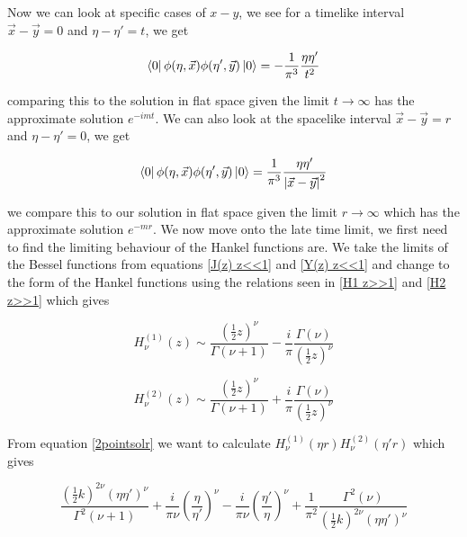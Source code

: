 \documentclass[a4paper,11pt]{article}
\numberwithin{equation}{section}
\numberwithin{figure}{section}
\begin{document}
\begin{large}
Now we can look at specific cases of $x-y$, we see for a timelike interval $\Vec{x}-\Vec{y}=0$ and $\eta-\eta'=t$, we get 

\begin{equation}
\label{2point eta>>1 x-y=0}    
    \bra{0} \phi(\eta,\Vec{x})\phi(\eta',\Vec{y})\ket{0}=-\frac{1}{\pi^3} \frac{\eta\eta'}{t^2}
\end{equation}


comparing this to the solution in flat space given the limit $t\rightarrow\infty$ has the approximate solution $e^{-imt}$. We can also look at the spacelike interval $\Vec{x}-\Vec{y}=r$ and $\eta-\eta'=0$, we get 


\begin{equation}
\label{2point eta>>1 eta-eta'=0}    
    \bra{0} \phi(\eta,\Vec{x})\phi(\eta',\Vec{y})\ket{0}=\frac{1}{\pi^3} \frac{\eta\eta'}{\abs{\Vec{x}-\Vec{y}}^2}
\end{equation}

we compare this to our solution in flat space given the limit $r\rightarrow\infty$ which has the approximate solution $e^{-mr}$.
\newline
We now move onto the late time limit, we first need to find the limiting behaviour of the Hankel functions are. We take the limits of the Bessel functions from equations \eqref{J(z) z<<1} and \eqref{Y(z) z<<1} and change to the form of the Hankel functions using the relations seen in \eqref{H1 z>>1} and \eqref{H2 z>>1} which gives

\begin{equation}
\label{H1 z<<1}    
    H^{(1)}_\nu(z)\sim \frac{(\frac{1}{2}z)^\nu}{\Gamma(\nu+1)}-\frac{i}{\pi}\frac{\Gamma(\nu)}{(\frac{1}{2}z)^\nu}
\end{equation}

\begin{equation}
\label{H2 z<<1}    
    H^{(2)}_\nu(z)\sim \frac{(\frac{1}{2}z)^\nu}{\Gamma(\nu+1)}+\frac{i}{\pi}\frac{\Gamma(\nu)}{(\frac{1}{2}z)^\nu}
\end{equation}

From equation \eqref{2pointsolr} we want to calculate $H^{(1)}_\nu(\eta r)H^{(2)}_\nu(\eta'r)$ which gives 

\begin{equation}
\label{H1H2}    
    \frac{(\frac{1}{2}k)^{2\nu}(\eta\eta')^\nu}{\Gamma^2(\nu+1)}+\frac{i}{\pi\nu}(\frac{\eta}{\eta'})^\nu-\frac{i}{\pi\nu}(\frac{\eta'}{\eta})^\nu+\frac{1}{\pi^2}\frac{\Gamma^2(\nu)}{(\frac{1}{2}k)^{2\nu}(\eta\eta')^\nu}
\end{equation}


\end{large}
\end{document}
